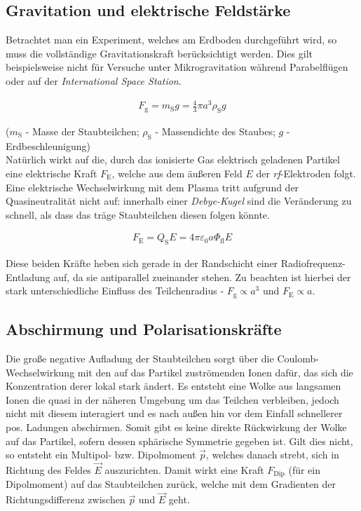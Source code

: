 \documentclass[numbers=noenddot,a4paper,notitlepage,twoside,BCOR15mm]{scrbook}
\newcommand{\ix}[1]{_\text{#1}}
\newcommand{\tilt}[1]{\textit{#1}}
\begin{document}
			\subsection{Gravitation und elektrische Feldstärke}\label{subsub:grav}

			Betrachtet man ein Experiment, welches am Erdboden durchgeführt wird, so muss die vollständige Gravitationskraft berücksichtigt werden. Dies gilt beispielsweise nicht für Versuche unter Mikrogravitation während Parabelflügen oder auf der \tilt{International Space Station}.

				\begin{align}
					F\ix{g}=m\ix{S} g=\frac{4}{3}\pi a^3 \rho\ix{S} g
				\end{align}

			($m\ix{S}$ - Masse der Staubteilchen; $\rho\ix{S}$ - Massendichte des Staubes; $g$ - Erdbeschleunigung)\\
			Natürlich wirkt auf die, durch das ionisierte Gas elektrisch geladenen Partikel eine elektrische Kraft $F\ix{E}$, welche aus dem äußeren Feld $E$ der \tilt{rf}-Elektroden folgt. Eine elektrische Wechselwirkung mit dem Plasma tritt aufgrund der Quasineutralität nicht auf: innerhalb einer \tilt{Debye-Kugel} sind die Veränderung zu schnell, als dass das träge Staubteilchen diesen folgen könnte. 

				\begin{align}
				F\ix{E}=Q\ix{S} E=4 \pi \varepsilon\ix{0} a \Phi\ix{fl} E
				\end{align}

			Diese beiden Kräfte heben sich gerade in der Randschicht einer Radiofrequenz-Entladung auf, da sie antiparallel zueinander stehen. Zu beachten ist hierbei der stark unterschiedliche Einfluss des Teilchenradius - $F\ix{g}\propto a^3$ und $F\ix{E}\propto a$.\\

			\subsection{Abschirmung und Polarisationskräfte}\label{subsub:abschirm}

			Die große negative Aufladung der Staubteilchen sorgt über die Coulomb-Wechselwirkung mit den auf das Partikel zuströmenden Ionen dafür, das sich die Konzentration derer lokal stark ändert. Es entsteht eine Wolke aus langsamen Ionen die quasi in der näheren Umgebung um das Teilchen verbleiben, jedoch nicht mit diesem interagiert und es nach außen hin vor dem Einfall schnellerer pos. Ladungen abschirmen. Somit gibt es keine direkte Rückwirkung der Wolke auf das Partikel, sofern dessen sphärische Symmetrie gegeben ist. Gilt dies nicht, so entsteht ein Multipol- bzw. Dipolmoment $\vec{p}$, welches danach strebt, sich in Richtung des Feldes $\vec{E}$ auszurichten. Damit wirkt eine Kraft $F\ix{Dip}$ (für ein Dipolmoment) auf das Staubteilchen zurück, welche mit dem Gradienten der Richtungsdifferenz zwischen $\vec{p}$ und $\vec{E}$ geht.
\end{document}
